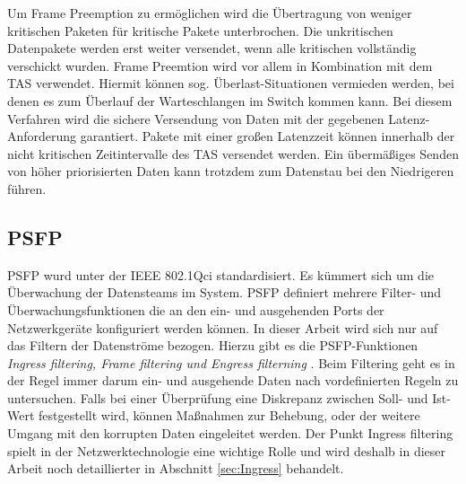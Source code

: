 Um Frame Preemption zu ermöglichen wird die Übertragung von weniger kritischen Paketen für kritische Pakete unterbrochen. Die unkritischen Datenpakete werden erst weiter versendet, wenn alle kritischen vollständig verschickt wurden. Frame Preemtion wird vor allem in Kombination mit dem \acl{TAS} verwendet. Hiermit können sog. Überlast-Situationen vermieden werden, bei denen es zum Überlauf der Warteschlangen im Switch kommen kann. Bei diesem Verfahren wird die sichere Versendung von Daten mit der gegebenen Latenz-Anforderung garantiert. Pakete mit einer großen Latenzzeit können innerhalb der nicht kritischen Zeitintervalle des \acs{TAS} versendet werden. Ein übermäßiges Senden von höher priorisierten Daten kann trotzdem zum Datenstau bei den Niedrigeren führen.

\subsection{\acl{PSFP}}\label{sec:Filter}
\acf{PSFP} wurd unter der IEEE 802.1Qci \cite{IEEE802_1Qci} standardisiert. Es kümmert sich um die Überwachung der Datensteams im System. \ac{PSFP} definiert mehrere Filter- und Überwachungsfunktionen die an den ein- und ausgehenden Ports der Netzwerkgeräte konfiguriert werden können. In dieser Arbeit wird sich nur auf das Filtern der Datenströme bezogen. Hierzu gibt es die \ac{PSFP}-Funktionen \emph{Ingress filtering, Frame filtering und Engress filterning} \cite{QIC}. Beim Filtering geht es in der Regel immer darum ein- und ausgehende Daten nach vordefinierten Regeln zu untersuchen. Falls bei einer Überprüfung eine Diskrepanz zwischen Soll- und Ist-Wert festgestellt wird, können Maßnahmen zur Behebung, oder der weitere Umgang mit den korrupten Daten eingeleitet werden. Der Punkt Ingress filtering spielt in der Netzwerktechnologie eine wichtige Rolle und wird deshalb in dieser Arbeit noch detaillierter in Abschnitt \ref{sec:Ingress} behandelt.

\newpage